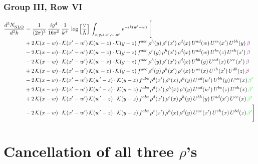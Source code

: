 \documentclass[9pt]{article}
\numberwithin{equation}{section}
\begin{document}
\subsubsection{Group III, Row VI}
\begin{align}
     \frac{d^{3}N_{\rm NLO}^{\rm}}{d^{3}k}  & = \frac{1}{(2\pi)^{3}}\, \frac{ig^{4}}{16\pi^{5}}\, \frac{1}{k^{+}}\, \log{\left[\frac{\vee}{\Lambda}\right]}\, \int_{x,y,z,x^{\prime},w,w^{\prime}}e^{-ik(w^{\prime}-w)}\, \Bigg[\notag \\ & +2\,\mathcal{K}(x-w)\cdot\mathcal{K}(x'-w')\,\mathcal{K}(w-z)\cdot\mathcal{K}(y-z)\, f^{abc}\,\rho^{h}(y)\,\rho^{e}(x')\,\rho^{d}(x)\,U^{ad}(w)\,U^{ce}(x')\,U^{bh}(y)\,{\color{violet} \beta}\notag\\ &-2\,\mathcal{K}(x-w)\cdot\mathcal{K}(x'-w')\,\mathcal{K}(w-z)\cdot\mathcal{K}(y-z)\, f^{abc}\,\rho^{e}(y)\,\rho^{h}(x')\,\rho^{d}(x)\,U^{ad}(w)\,U^{be}(z)\,U^{ch}(x')\,{\color{violet} \beta}\notag \\ &-2\,\mathcal{K}(x-w)\cdot\mathcal{K}(x'-w')\,\mathcal{K}(w-z)\cdot\mathcal{K}(y-z)\, f^{abc}\,\rho^{h}(y)\,\rho^{e}(x')\,\rho^{d}(x)\,U^{bh}(y)\,U^{ad}(x)\,U^{ce}(x')\,{\color{violet} \beta}\notag\\ & +2\,\mathcal{K}(x-w)\cdot\mathcal{K}(x'-w')\,\mathcal{K}(w-z)\cdot\mathcal{K}(y-z)\, f^{abc}\,\rho^{d}(y)\,\rho^{h}(x')\,\rho^{e}(x)\,U^{ae}(x)\,U^{ch}(x')\,U^{db}(z)\,{\color{violet} \beta}\notag\\ & -2\, \mathcal{K}(x-w) \cdot \mathcal{K}(x'-w')\, \mathcal{K}(w'-z) \cdot \mathcal{K}(y-z)\, f^{abc}\, \rho^{d}(x')\,\rho^{e}(x)\, \rho^{h}(y)\,U^{ad}(w')\,U^{bh}(y)\,U^{ce}(x)\, {\color{green} \beta'}\notag \\ & + 2\, \mathcal{K}(x-w) \cdot \mathcal{K}(x'-w')\, \mathcal{K}(w'-z) \cdot \mathcal{K}(y-z)\, f^{abc}\, \rho^{d}(x')\,\rho^{h}(x)\, \rho^{e}(y)\,U^{ad}(w')\,U^{be}(z)\,U^{ch}(x)\, {\color{green} \beta'}\notag \\ & +2\, \mathcal{K}(x-w) \cdot \mathcal{K}(x'-w')\, \mathcal{K}(w'-z) \cdot \mathcal{K}(y-z)\, f^{abc}\, \rho^{d}(x')\,\rho^{e}(x)\, \rho^{h}(y)\,U^{bh}(y)\,U^{ad}(x')\,U^{ce}(x)\, {\color{green} \beta'}\notag \\ & -2\, \mathcal{K}(x-w) \cdot \mathcal{K}(x'-w')\, \mathcal{K}(w'-z) \cdot \mathcal{K}(y-z)\, f^{abc}\, \rho^{e}(x')\,\rho^{h}(x)\, \rho^{d}(y)\,U^{ae}(x')\,U^{ch}(x)\,U^{bd}(z)\, {\color{green} \beta'}\Bigg]
\end{align}  
\section{Cancellation of all three $\rho$'s}
\end{document}
